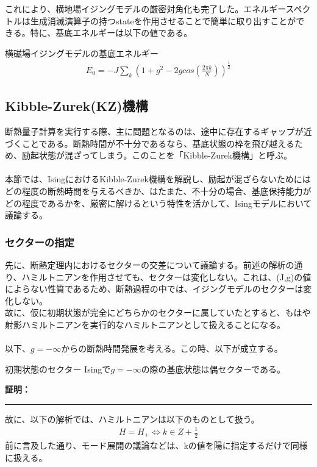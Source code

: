 \documentclass[a4paper,10.5pt]{article}
\numberwithin{equation}{section}
\newenvironment{proofbox}
{\begin{prooflabel}\textbf{証明：}\end{prooflabel}\vspace{0.8em}}
{\par\vspace{1em}\hrule\vspace{1em}}
\begin{document}
これにより、横地場イジングモデルの厳密対角化も完了した。エネルギースペクトルは生成消滅演算子の持つstateを作用させることで簡単に取り出すことができる。特に、基底エネルギーは以下の値である。
\begin{resultbox}{横磁場イジングモデルの基底エネルギー}
\begin{equation}\begin{split}
    E_{0}=-J\sum_{k}(1+g^{2}-2gcos(\frac{2\pi k}{N}))^{\frac{1}{2}}
\end{split} \end{equation}
\end{resultbox}

\subsection{Kibble-Zurek(KZ)機構}
断熱量子計算を実行する際、主に問題となるのは、途中に存在するギャップが近づくことである。断熱時間が不十分であるなら、基底状態の枠を飛び越えるため、励起状態が混ざってしまう。このことを「Kibble-Zurek機構」と呼ぶ。\\
\\
本節では、IsingにおけるKibble-Zurek機構を解説し、励起が混ざらないためにはどの程度の断熱時間を与えるべきか、はたまた、不十分の場合、基底保持能力がどの程度であるかを、厳密に解けるという特性を活かして、Isingモデルにおいて議論する。
\subsubsection{セクターの指定}
先に、断熱定理内におけるセクターの交差について議論する。前述の解析の通り、ハミルトニアンを作用させても、セクターは変化しない。これは、(J,g)の値によらない性質であるため、断熱過程の中では、イジングモデルのセクターは変化しない。\\
故に、仮に初期状態が完全にどちらかのセクターに属していたとすると、もはや射影ハミルトニアンを実行的なハミルトニアンとして扱えることになる。\\
\\
以下、$g=-\infty$からの断熱時間発展を考える。この時、以下が成立する。
\begin{resultbox}{初期状態のセクター}
    Isingで$g=-\infty$の際の基底状態は偶セクターである。
\end{resultbox}
\begin{proofbox}
    
\end{proofbox}
故に、以下の解析では、ハミルトニアンは以下のものとして扱う。
\begin{align*}
    H=H_{+} \iff k \in Z+\frac{1}{2}
\end{align*}
前に言及した通り、モード展開の議論などは、kの値を陽に指定するだけで同様に扱える。
\end{document}
